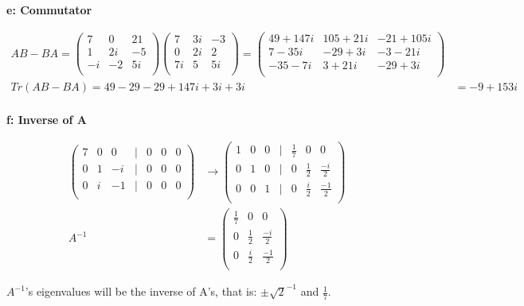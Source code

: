 \documentclass[10pt]{article} %
\begin{document}
\textbf{e: Commutator}

\begin{align*}
  AB - BA =
  \begin{pmatrix}
    7 & 0 & 21\\
    1 & 2i & -5\\
    -i & -2 & 5i\\
  \end{pmatrix}
  \begin{pmatrix}
    7 & 3i & -3\\
    0 & 2i & 2\\
    7i & 5 & 5i\\
  \end{pmatrix}
  =
  \begin{pmatrix}
    49 + 147i & 105 + 21i & -21 + 105i\\
    7 - 35i & -29 + 3i & -3 - 21i\\
    -35 - 7i & 3 + 21i & -29 + 3i\\
  \end{pmatrix}\\
  Tr(AB-BA) = 49 - 29 - 29 + 147i + 3i + 3i &= -9 + 153i\\
\end{align*}

\textbf{f: Inverse of A}

\begin{align*}
  \begin{pmatrix}
    7 & 0 & 0 &  | & 0 & 0 & 0\\
    0 & 1 & -i & | & 0 & 0 & 0\\
    0 & i & -1 & | & 0 & 0 & 0\\
  \end{pmatrix}
  &\rightarrow
  \begin{pmatrix}
    1 & 0 & 0 & | & \frac17 & 0 & 0\\
    0 & 1 & 0 & | & 0 & \frac12 & \frac{-i}{2}\\
    0 & 0 & 1 & | & 0 & \frac{i}{2} & \frac{-1}{2}\\
  \end{pmatrix}\\
  A^{-1} &=
  \begin{pmatrix}
    \frac17 & 0 & 0\\               
    0 & \frac12 & \frac{-i}{2}\\
    0 & \frac{i}{2} & \frac{-1}{2}\\
  \end{pmatrix}
\end{align*}

$A^{-1}$'s eigenvalues will be the inverse of A's, that is: $\pm\sqrt{2}^{-1}$ and $\frac17$.
\end{document}
